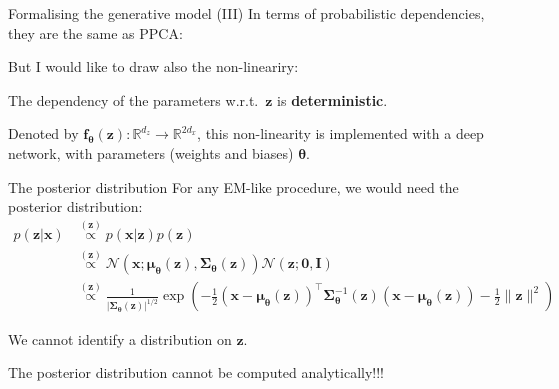 \documentclass[aspectratio=169]{beamer}
\newcommand{\MN}{{\mathcal N}}
\newcommand{\bs}[1]{\boldsymbol{#1}}
\begin{document}
\begin{frame}{Formalising the generative model (III)}
  In terms of probabilistic dependencies, they are the same as PPCA:\vspace{3mm}\\
  \vspace{3mm}

  But I would like to draw also the non-lineariry:\vspace{3mm}

  \vspace{3mm}

  The dependency of the parameters w.r.t.\ $\bs{z}$ is \textbf{deterministic}.\vspace{3mm}

  Denoted by $\bs{f}_{\bs{\theta}}(\bs{z}):\mathbb{R}^{d_z}\rightarrow\mathbb{R}^{2d_x}$, this non-linearity is implemented with a deep network, with parameters (weights and biases) $\bs{\theta}$.

\end{frame}

\begin{frame}{The posterior distribution}
 For any EM-like procedure, we would need the posterior distribution:
 \begin{align}
  p(\bs{z}|\bs{x}) & \stackrel{(\bs{z})}{\propto}  p(\bs{x}|\bs{z})p(\bs{z}) \\
  &\stackrel{(\bs{z})}{\propto} \MN(\bs{x};\bs{\mu}_{\bs{\theta}}(\bs{z}),\bs{\Sigma}_{\bs{\theta}}(\bs{z})) \MN(\bs{z};\bs{0},\bs{I}) \\
  &\stackrel{(\bs{z})}{\propto} \frac{1}{|\bs{\Sigma}_{\bs{\theta}}(\bs{z})|^{1/2}} \exp\left(-\frac{1}{2} (\bs{x}-\bs{\mu}_{\bs{\theta}}(\bs{z}))^\top \bs{\Sigma}_{\bs{\theta}}^{-1}(\bs{z})(\bs{x}-\bs{\mu}_{\bs{\theta}}(\bs{z})) - \frac{1}{2}\lVert\bs{z}\rVert^2 \right)
 \end{align}\pause

 We cannot identify a distribution on $\bs{z}$.\vspace{3mm}

 The posterior distribution cannot be computed analytically!!!

\end{frame}
\end{document}
